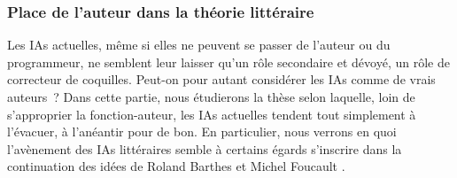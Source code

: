 \documentclass{article}
\begin{document}
			\subsubsection{Place de l'auteur dans la théorie littéraire}\label{place_auteur}
				Les IAs actuelles, même si elles ne peuvent se passer de l'auteur ou du programmeur, ne semblent leur laisser qu'un rôle secondaire et dévoyé, un rôle de correcteur de coquilles. Peut-on pour autant considérer les IAs comme de vrais auteurs~? Dans cette partie, nous étudierons la thèse selon laquelle, loin de s'approprier la fonction-auteur, les IAs actuelles tendent tout simplement à l'évacuer, à l'anéantir pour de bon. En particulier, nous verrons en quoi l'avènement des IAs littéraires semble à certains égards s'inscrire dans la continuation des idées de Roland Barthes \autocite{barthes1968} et Michel Foucault \autocite{foucault1969}.
				
\end{document}
